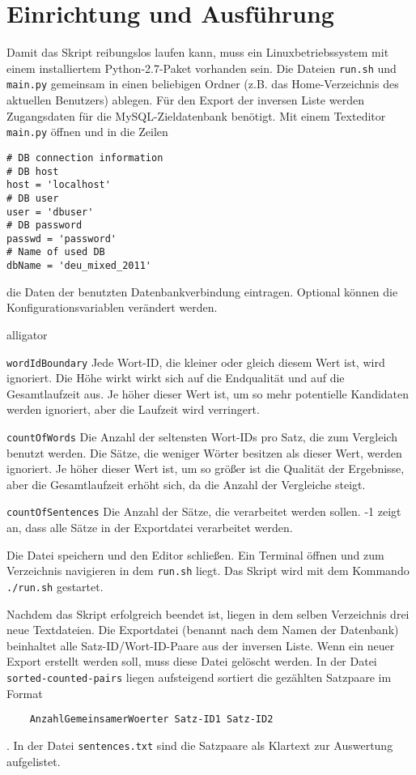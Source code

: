\documentclass[a4paper,11pt,utf8]{scrartcl}
\begin{document}
\section{Einrichtung und Ausführung}
Damit das Skript reibungslos laufen kann, muss ein Linuxbetriebssystem mit einem installiertem Python-2.7-Paket vorhanden sein. Die Dateien \texttt{run.sh} und \texttt{main.py} gemeinsam in einen beliebigen Ordner (z.B. das Home-Verzeichnis des aktuellen Benutzers) ablegen. Für den Export der inversen Liste werden Zugangsdaten für die MySQL-Zieldatenbank benötigt. Mit einem Texteditor \texttt{main.py} öffnen und in die Zeilen
\begin{lstlisting}
# DB connection information
# DB host
host = 'localhost'
# DB user
user = 'dbuser'
# DB password
passwd = 'password'
# Name of used DB
dbName = 'deu_mixed_2011'
\end{lstlisting}
die Daten der benutzten Datenbankverbindung eintragen. Optional können die Konfigurationsvariablen verändert werden.
\begin{labeling}{alligator}
	\item [\texttt{wordIdBoundary}] Jede Wort-ID, die kleiner oder gleich diesem Wert ist, wird ignoriert. Die Höhe wirkt wirkt sich auf die Endqualität und auf die Gesamtlaufzeit aus. Je höher dieser Wert ist, um so mehr potentielle Kandidaten werden ignoriert, aber die Laufzeit wird verringert.
	\item [\texttt{countOfWords}] Die Anzahl der seltensten Wort-IDs pro Satz, die zum Vergleich benutzt werden. Die Sätze, die weniger Wörter besitzen als dieser Wert, werden ignoriert. Je höher dieser Wert ist, um so größer ist die Qualität der Ergebnisse, aber die Gesamtlaufzeit erhöht sich, da die Anzahl der Vergleiche steigt.
	\item [\texttt{countOfSentences}] Die Anzahl der Sätze, die verarbeitet werden sollen. -1 zeigt an, dass alle Sätze in der Exportdatei verarbeitet werden.
\end{labeling}
Die Datei speichern und den Editor schließen. Ein Terminal öffnen und zum Verzeichnis navigieren in dem \texttt{run.sh} liegt. Das Skript wird mit dem Kommando \texttt{./run.sh} gestartet.

Nachdem das Skript erfolgreich beendet ist, liegen in dem selben Verzeichnis drei neue Textdateien. Die Exportdatei (benannt nach dem Namen der Datenbank) beinhaltet alle Satz-ID/Wort-ID-Paare aus der inversen Liste. Wenn ein neuer Export erstellt werden soll, muss diese Datei gelöscht werden. In der Datei \texttt{sorted-counted-pairs} liegen aufsteigend sortiert die gezählten Satzpaare im Format 
\begin{lstlisting}
	AnzahlGemeinsamerWoerter Satz-ID1 Satz-ID2
\end{lstlisting}
. In der Datei \texttt{sentences.txt} sind die Satzpaare als Klartext zur Auswertung aufgelistet.
\end{document}
